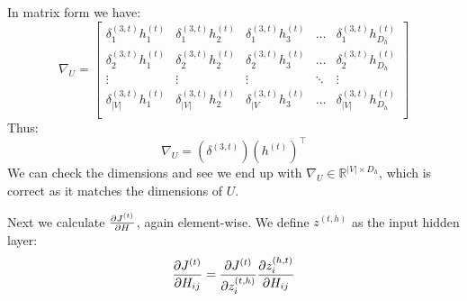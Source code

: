 \documentclass[]{article}
\newcommand{\deriv}[2]{%
	\ensuremath{\frac{\partial {#1}}{\partial {#2}}}}
\newcommand{\slayer}[3]{ %
	\ensuremath{{#1}^{(#2)}_{#3}}}
\newcommand{\vlayer}[2]{ %
	\ensuremath{{#1}^{(#2)}}}
\newcommand{\reals}[1]{ %
	\ensuremath{\in \mathbb{R}^{#1}}}
\begin{document}
In matrix form we have:
\[
\nabla_{U} = 
\begin{bmatrix}
\slayer{\delta}{3,t}{1}\slayer{h}{t}{1}       & \slayer{\delta}{3,t}{1}\slayer{h}{t}{2} & \slayer{\delta}{3,t}{1}\slayer{h}{t}{3} & \dots & \slayer{\delta}{3,t}{1}\slayer{h}{t}{D_h} \\
\slayer{\delta}{3,t}{2}\slayer{h}{t}{1}       & \slayer{\delta}{3,t}{2}\slayer{h}{t}{2} & \slayer{\delta}{3,t}{2}\slayer{h}{t}{3} & \dots & \slayer{\delta}{3,t}{2}\slayer{h}{t}{D_h} \\
\vdots	& \vdots	&\vdots	&\ddots	& \vdots \\
\slayer{\delta}{3,t}{|V|}\slayer{h}{t}{1}       & \slayer{\delta}{3,t}{|V|}\slayer{h}{t}{2} & \slayer{\delta}{3,t}{|V}\slayer{h}{t}{3} & \dots & \slayer{\delta}{3,t}{|V|}\slayer{h}{t}{D_h} \\
\end{bmatrix}
\]
Thus:
\begin{equation} \label{eq:d3,t}
\nabla_U = (\vlayer{\delta}{3,t})(\vlayer{h}{t})^\top
\end{equation}We can check the dimensions and see we end up with $\nabla_U \reals{|V| \times D_h}$, which is correct as it matches the dimensions of $U$.

Next we calculate \deriv{\vlayer{J}{t}}{H}, again element-wise. We define $\vlayer{z}{t,h}$ as the input hidden layer:
$$\deriv{\vlayer{J}{t}}{H_{ij}} = \deriv{\vlayer{J}{t}}{\slayer{z}{t,h}{i}} \deriv{\slayer{z}{h,t}{i}}{H_{ij}}$$
\end{document}
